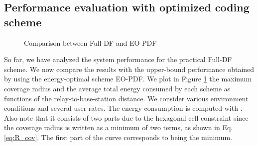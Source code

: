 \documentclass[journal]{IEEEtran}
\theoremstyle{definition}
\begin{document}
\begin{figure*}
{
}
\vspace*{-5pt}\caption{Impact of the LOS conditions  on the cell coverage using Full-DF} 
\label{fig:LOS_condition_illustration}
\end{figure*}




\subsection{Performance evaluation with optimized coding scheme}


\begin{figure}
	{\centering 
	\caption{Comparison between Full-DF and EO-PDF} 
	\label{fig:with_EO_PDF} 
	}
\end{figure}

So far, we have analyzed the system performance for the practical Full-DF scheme. We now compare the results with the upper-bound performance obtained by using the energy-optimal scheme EO-PDF.
We plot in Figure \ref{fig:with_EO_PDF} the maximum coverage radius and the average total energy consumed by each scheme as functions of the relay-to-base-station distance. We consider various environment conditions and several user rates. The energy consumption is computed with .
Also note that it consists of two parts due to the hexagonal cell constraint since the coverage radius is written as a minimum of two terms, as shown in Eq. \eqref{eq:R_cov}. The first part of the curve corresponds to  being the minimum.
\end{document}

